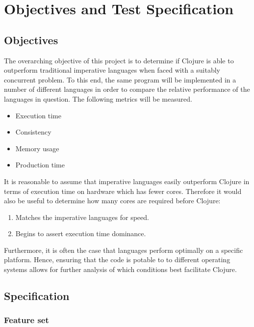 \documentclass[12pt,a4paper]{article}
\begin{document}
\newpage
\section{Objectives and Test Specification}

\subsection{Objectives}

The overarching objective of this project is to determine if Clojure is able to outperform traditional imperative languages when faced with a suitably concurrent problem. To this end, the same program will be implemented in a number of different languages in order to compare the relative performance of the languages in question. The following metrics will be measured.

\begin{itemize} \itemsep0pt
    \item Execution time
    \item Consistency
    \item Memory usage
    \item Production time
\end{itemize}

It is reasonable to assume that imperative languages easily outperform Clojure in terms of execution time on hardware which has fewer cores. Therefore it would also be useful to determine how many cores are required before Clojure:

\begin{enumerate} \itemsep0pt
    \item Matches the imperative languages for speed.
    \item Begins to assert execution time dominance.
\end{enumerate}

Furthermore, it is often the case that languages perform optimally on a specific platform. Hence, ensuring that the code is potable to to different operating systems allows for further analysis of which conditions best facilitate Clojure.

\newpage
\subsection{Specification}

\subsubsection{Feature set}
\end{document}
